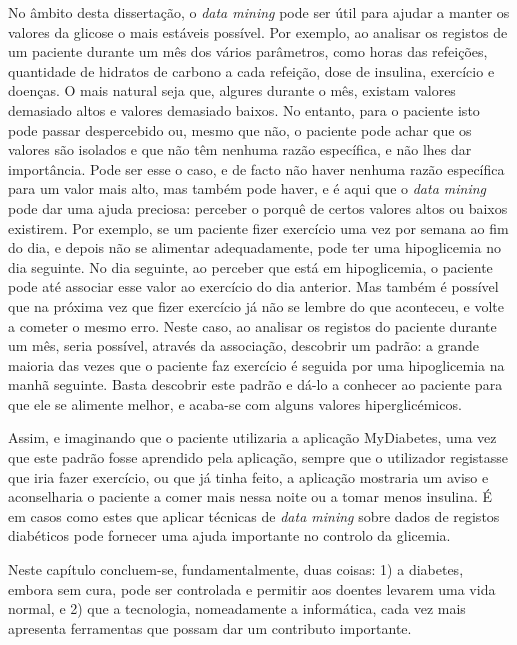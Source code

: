 No âmbito desta dissertação, o \textit{data mining} pode ser útil para ajudar a manter os valores da glicose o mais estáveis possível. Por exemplo, ao analisar os registos de um paciente durante um mês dos vários parâmetros, como horas das refeições, quantidade de hidratos de carbono a cada refeição, dose de insulina, exercício e doenças. O mais natural seja que, algures durante o mês, existam valores demasiado altos e valores demasiado baixos. 
No entanto, para o paciente isto pode passar despercebido ou, mesmo que não, o paciente pode achar que os valores são isolados e que não têm nenhuma razão específica, e não lhes dar importância. Pode ser esse o caso, e de facto não haver nenhuma razão específica para um valor mais alto, mas também pode haver, e é aqui que o \textit{data mining} pode dar uma ajuda preciosa:  perceber o porquê de certos valores altos ou baixos existirem. Por exemplo, se um paciente fizer exercício uma vez por semana ao fim do dia, e depois não se alimentar adequadamente, pode ter uma hipoglicemia no dia seguinte. No dia seguinte, ao perceber que está em hipoglicemia, o paciente pode até associar esse valor ao exercício do dia anterior. Mas também é possível que na próxima vez que fizer exercício já não se lembre do que aconteceu, e volte a cometer o mesmo erro. 
Neste caso, ao analisar os registos do paciente durante um mês, seria possível, através da associação, descobrir um padrão: a grande maioria das vezes que o paciente faz exercício é seguida por uma hipoglicemia na manhã seguinte. Basta descobrir este padrão e dá-lo a conhecer ao paciente para que ele se alimente melhor, e acaba-se com alguns valores hiperglicémicos. 

Assim, e imaginando que o paciente utilizaria a aplicação MyDiabetes, uma vez que este padrão fosse aprendido pela aplicação, sempre que o utilizador registasse que iria fazer exercício, ou que já tinha feito, a aplicação mostraria um aviso e aconselharia o paciente a comer mais nessa noite ou a tomar menos insulina. É em casos como estes que aplicar técnicas de \textit{data mining} sobre dados de registos diabéticos pode fornecer uma ajuda importante no controlo da glicemia.\newline

Neste capítulo concluem-se, fundamentalmente, duas coisas: 1) a diabetes, embora sem cura, pode ser controlada e permitir aos doentes levarem uma vida normal, e 2) que a tecnologia, nomeadamente a informática, cada vez mais apresenta ferramentas que possam dar um contributo importante. 

